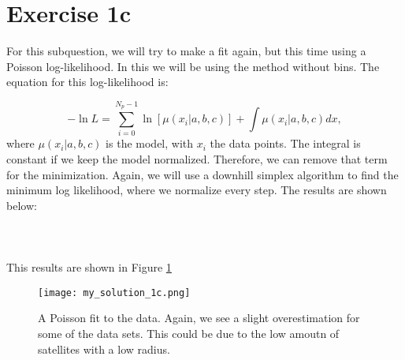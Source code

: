 \section{Exercise 1c}

For this subquestion, we will try to make a fit again, but this time using a Poisson log-likelihood. In this we will be using the method without bins. The equation for this log-likelihood is: 

\begin{equation}
    -\ln{L} = \sum^{N_p-1}_{i = 0} \ln{[\mu(x_i|a,b,c)] + \int \mu(x_i|a,b,c) dx}, 
\end{equation}
where $\mu(x_i|a,b,c)$ is the model, with $x_i$ the data points. The integral is constant if we keep the model normalized. Therefore, we can remove that term for the minimization. Again, we will use a downhill simplex algorithm to find the minimum log likelihood, where we normalize every step. The results are shown below: 
\\
\\

\\
\\
This results are shown in Figure \ref{fig:1c}

\begin{figure}[h!]
  \centering
  \texttt{[image: my\_solution\_1c.png]}
  \caption{A Poisson fit to the data. Again, we see a slight overestimation for some of the data sets. This could be due to the low amoutn of satellites with a low radius.}
  \label{fig:1c}
\end{figure}